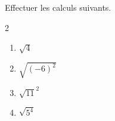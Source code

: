 \begin{exo}{}
	Effectuer les calculs suivants.
	\vspace*{-2mm}\begin{multicols}{2}
	\begin{enumerate}
		\item $\sqrt{4}$
		\item $\sqrt{(-6)^2}$
		\item $\sqrt{11}^2$
		\item $\sqrt{5^4}$
	\end{enumerate}
	\end{multicols}
\end{exo}
